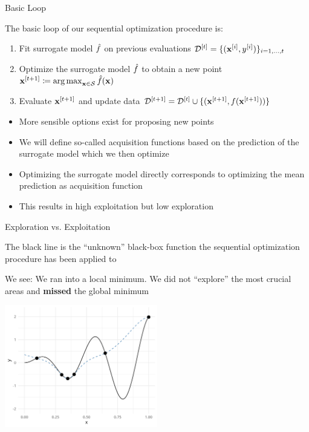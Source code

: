 \documentclass[11pt,compress,t,notes=noshow, xcolor=table]{beamer}
\begin{document}
\begin{vbframe}{Basic Loop}

The basic loop of our sequential optimization procedure is:
  \begin{enumerate}
    \item Fit surrogate model $\hat{f}$ on previous evaluations $\mathcal{D}^{[t]} = \{(\mathbf{x}^{[i]}, y^{[i]})\}_{i = 1, \ldots, t}$
    \item Optimize the surrogate model $\hat{f}$ to obtain a new point $\mathbf{x}^{[t+1]} \coloneqq \operatorname{arg\,max}_{\mathbf{x} \in \mathcal{S}} \hat{f}(\mathbf{x})$
    \item Evaluate $\mathbf{x}^{[t+1]}$ and update data $\mathcal{D}^{[t+1]} = \mathcal{D}^{[t]} \cup \{(\mathbf{x}^{[t+1]}, f(\mathbf{x}^{[t+1]}))\}$
  \end{enumerate}

\framebreak

\begin{itemize}
  \item More sensible options exist for proposing new points
  \item We will define so-called acquisition functions based on the prediction of the surrogate model which we then optimize
  \item Optimizing the surrogate model directly corresponds to optimizing the mean prediction as acquisition function
  \item This results in high exploitation but low exploration
\end{itemize}

\end{vbframe}

\begin{vbframe}{Exploration vs. Exploitation}

The black line is the \enquote{unknown} black-box function the sequential optimization procedure has been applied to

\vspace*{0.2cm} 
We see: We ran into a local minimum. We did not \enquote{explore} the most crucial areas and \textbf{missed} the global minimum

\vspace{+.45cm}

\begin{center}
  \includegraphics[width = 0.5\textwidth]{figure_man/loop_11.png}
\end{center}


\end{vbframe} 

\endlecture
\end{document}
